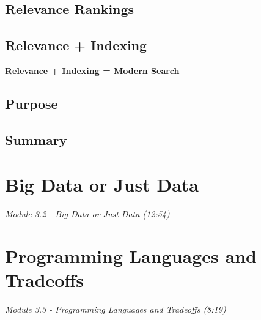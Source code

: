 \documentclass[
]{book}
\begin{document}
\subsection{Relevance Rankings}\label{relevance-rankings}

\subsection{Relevance + Indexing}\label{relevance-indexing}

\textbf{Relevance + Indexing = Modern Search}

\subsection{Purpose}\label{purpose}

\subsection{Summary}\label{summary-3}

\section{Big Data or Just Data}\label{big-data-or-just-data}

\emph{Module 3.2 - Big Data or Just Data (12:54)}

\section{Programming Languages and Tradeoffs}\label{programming-languages-and-tradeoffs}

\emph{Module 3.3 - Programming Languages and Tradeoffs (8:19)}
\end{document}
